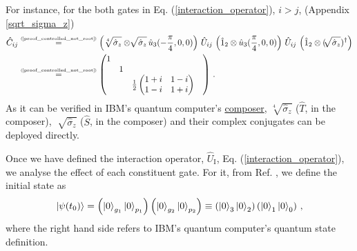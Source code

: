 \documentclass[11pt]{article}
\numberwithin{equation}{section} %
\numberwithin{figure}{section} %
\newcommand\numeq[1] %
  {\stackrel{\scriptscriptstyle(\mkern-1.5mu#1\mkern-1.5mu)}{=}}
\begin{document}
For instance, for the both gates in Eq. (\ref{interaction_operator}), $i>j$,  (Appendix \ref{sqrt_sigma_z})
\begin{equation} \label{controlled_not_root}
\begin{split}
\hat{C}_{ij}
&	\numeq{\textrm{\ref{proof_controlled_not_root}}} \left( \sqrt[4]{\hat{\sigma}_z}\otimes\sqrt[]{\hat{\sigma}_z}\, \hat{u}_3(-\frac{\pi}{4},0,0) \right)\,\hat{U}_{ij}\, \left(\hat{1}_2\otimes\hat{u}_3(\frac{\pi}{4},0,0)\right)\,\hat{U}_{ij}\,	\left(\hat{1}_2\otimes(\sqrt[]{\hat{\sigma}_z})^\dagger\right)\\
&	\numeq{\textrm{\ref{proof_controlled_not_root}}}\begin{pmatrix}1&&&\\ &1&&\\ &&\frac{1}{2}\begin{pmatrix} 1+i & 1-i \\ 1-i & 1+i
\end{pmatrix}\end{pmatrix}\,\textrm{.}
\end{split}
\end{equation}
As it can be verified in IBM's quantum computer's \href{https://quantumexperience.ng.bluemix.net/qx/editor}{composer}, $\sqrt[4]{\hat{\sigma}_z}$ ($\hat{T}$, in the composer), $\sqrt[]{\hat{\sigma}_z}$ ($\hat{S}$, in the composer) and their complex conjugates can be deployed directly.

\vspace{0.8cm}
Once we have defined the interaction operator, $\hat{U}_{\textrm{I}}$, Eq. (\ref{interaction_operator}), we analyse the effect of each constituent gate. For it, from Ref. \cite[p.~3, Fig.~1]{QAL_IBM}, we define the initial state as
\begin{equation} \label{psi_t0}
\ket{\psi(t_0)} =\left(\ket{0}_{g_1}\ket{0}_{p_1}\right) \left(\ket{0}_{g_2}\ket{0}_{p_2}\right) \equiv \left(\ket{0}_3\ket{0}_2\right)\left(\ket{0}_1\ket{0}_0\right)\,\textrm{,} 
\end{equation}
where the right hand side refers to IBM's quantum computer's quantum state definition.\\
\end{document}

